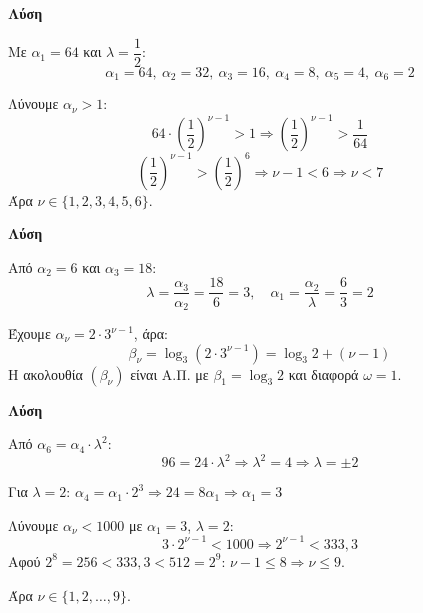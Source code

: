 \documentclass[11pt,a4paper,modern]{FFExercises}
\begin{document}
\askhsh
\textbf{Λύση}
\begin{alist}
  \item Με $\alpha_1 = 64$ και $\lambda = \dfrac{1}{2}$:
  \[
  \alpha_1 = 64,\ \alpha_2 = 32,\ \alpha_3 = 16,\ \alpha_4 = 8,\ \alpha_5 = 4,\ \alpha_6 = 2
  \]
  
  \item Λύνουμε $\alpha_\nu > 1$:
  \[
  64 \cdot \left(\frac{1}{2}\right)^{\nu-1} > 1 \Rightarrow \left(\frac{1}{2}\right)^{\nu-1} > \frac{1}{64}
  \]
  \[
  \left(\frac{1}{2}\right)^{\nu-1} > \left(\frac{1}{2}\right)^6 \Rightarrow \nu - 1 < 6 \Rightarrow \nu < 7
  \]
  Άρα $\nu \in \{1, 2, 3, 4, 5, 6\}$.
\end{alist}

\askhsh
\textbf{Λύση}
\begin{alist}
  \item Από $\alpha_2 = 6$ και $\alpha_3 = 18$:
  \[
  \lambda = \frac{\alpha_3}{\alpha_2} = \frac{18}{6} = 3, \quad \alpha_1 = \frac{\alpha_2}{\lambda} = \frac{6}{3} = 2
  \]
  
  \item Έχουμε $\alpha_\nu = 2 \cdot 3^{\nu-1}$, άρα:
  \[
  \beta_\nu = \log_3(2 \cdot 3^{\nu-1}) = \log_3 2 + (\nu-1)
  \]
  Η ακολουθία $(\beta_\nu)$ είναι Α.Π. με $\beta_1 = \log_3 2$ και διαφορά $\omega = 1$.
\end{alist}

\askhsh
\textbf{Λύση}
\begin{alist}
  \item Από $\alpha_6 = \alpha_4 \cdot \lambda^2$:
  \[
  96 = 24 \cdot \lambda^2 \Rightarrow \lambda^2 = 4 \Rightarrow \lambda = \pm 2
  \]
  
  \item Για $\lambda = 2$: $\alpha_4 = \alpha_1 \cdot 2^3 \Rightarrow 24 = 8\alpha_1 \Rightarrow \alpha_1 = 3$
  
  \item Λύνουμε $\alpha_\nu < 1000$ με $\alpha_1 = 3$, $\lambda = 2$:
  \[
  3 \cdot 2^{\nu-1} < 1000 \Rightarrow 2^{\nu-1} < 333{,}3
  \]
  Αφού $2^8 = 256 < 333{,}3 < 512 = 2^9$: $\nu - 1 \leq 8 \Rightarrow \nu \leq 9$.
  
  Άρα $\nu \in \{1, 2, \ldots, 9\}$.
\end{alist}

\end{document}

